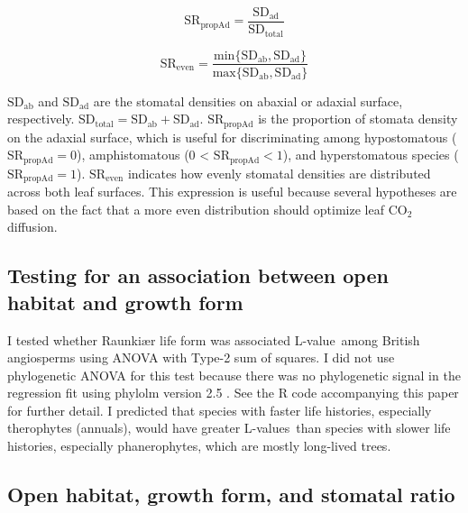 \documentclass[12pt, oneside]{article}
\newcommand{\pkg}[1]{{\fontseries{b}\selectfont #1}}
\newcommand{\el}{L-value}
\newcommand{\els}{L-values}
\begin{document}
\begin{equation} \label{eq:SRpropAd} 
  \mathrm{SR_{propAd}} = \frac{\mathrm{SD_{ad}}}{\mathrm{SD_{total}}}
\end{equation}

\begin{equation} \label{eq:SReven1} 
  \mathrm{SR_{even}} = \frac{\mathrm{min}\{\mathrm{SD_{ab}}, \mathrm{SD_{ad}}\}}{\mathrm{max}\{\mathrm{SD_{ab}}, \mathrm{SD_{ad}}\}}
\end{equation}

$\mathrm{SD_{ab}}$ and $\mathrm{SD_{ad}}$ are the stomatal densities on abaxial or adaxial surface, respectively. $\mathrm{SD_{total}} = \mathrm{SD_{ab}} + \mathrm{SD_{ad}}$. $\mathrm{SR_{propAd}}$ is the proportion of stomata density on the adaxial surface, which is useful for discriminating among hypostomatous ($\mathrm{SR_{propAd}} = 0$), amphistomatous (0 < $\mathrm{SR_{propAd}} < 1$), and hyperstomatous species ($\mathrm{SR_\mathrm{propAd}} = 1$). $\mathrm{SR_\mathrm{even}}$ indicates how evenly stomatal densities are distributed across both leaf surfaces. This expression is useful because several hypotheses are based on the fact that a more even distribution should optimize leaf CO$_2$ diffusion.

\subsection*{Testing for an association between open habitat and growth form}

I tested whether Raunki\ae r life form was associated \el~among British angiosperms using ANOVA with Type-2 sum of squares. I did not use phylogenetic ANOVA for this test because there was no phylogenetic signal in the regression fit using \pkg{phylolm} version 2.5 \citep{Ho_Ane_2014}. See the R code accompanying this paper for further detail. I predicted that species with faster life histories, especially therophytes (annuals), would have greater \els~than species with slower life histories, especially phanerophytes, which are mostly long-lived trees. 

\subsection*{Open habitat, growth form, and stomatal ratio}
\end{document}
